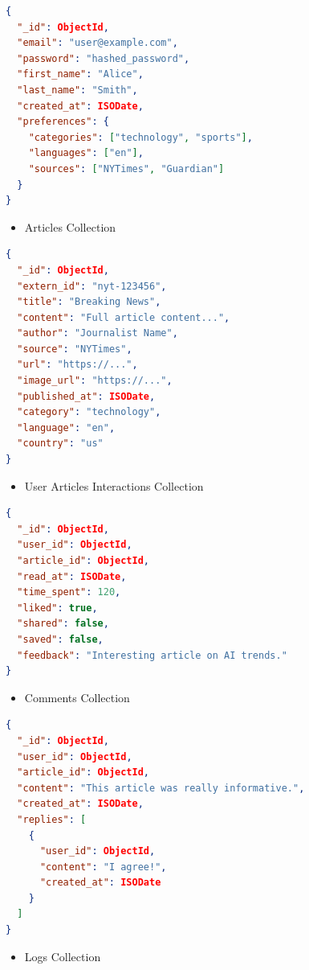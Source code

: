 \begin{lstlisting}[language=json]
{
  "_id": ObjectId,
  "email": "user@example.com",
  "password": "hashed_password",
  "first_name": "Alice",
  "last_name": "Smith",
  "created_at": ISODate,
  "preferences": {
    "categories": ["technology", "sports"],
    "languages": ["en"],
    "sources": ["NYTimes", "Guardian"]
  }
}
\end{lstlisting}


\begin{itemize}
    \item Articles Collection
\end{itemize}

\begin{lstlisting}[language=json]
{
  "_id": ObjectId,
  "extern_id": "nyt-123456",
  "title": "Breaking News",
  "content": "Full article content...",
  "author": "Journalist Name",
  "source": "NYTimes",
  "url": "https://...",
  "image_url": "https://...",
  "published_at": ISODate,
  "category": "technology",
  "language": "en",
  "country": "us"
}
\end{lstlisting}

\begin{itemize}
    \item User Articles Interactions Collection
\end{itemize}

\begin{lstlisting}[language=json]
{
  "_id": ObjectId,
  "user_id": ObjectId,
  "article_id": ObjectId,
  "read_at": ISODate,
  "time_spent": 120,
  "liked": true,
  "shared": false,
  "saved": false,
  "feedback": "Interesting article on AI trends."
}
\end{lstlisting}

\begin{itemize}
    \item Comments Collection
\end{itemize}

\begin{lstlisting}[language=json]
{
  "_id": ObjectId,
  "user_id": ObjectId,
  "article_id": ObjectId,
  "content": "This article was really informative.",
  "created_at": ISODate,
  "replies": [
    {
      "user_id": ObjectId,
      "content": "I agree!",
      "created_at": ISODate
    }
  ]
}
\end{lstlisting}

\begin{itemize}
    \item Logs Collection
\end{itemize}


